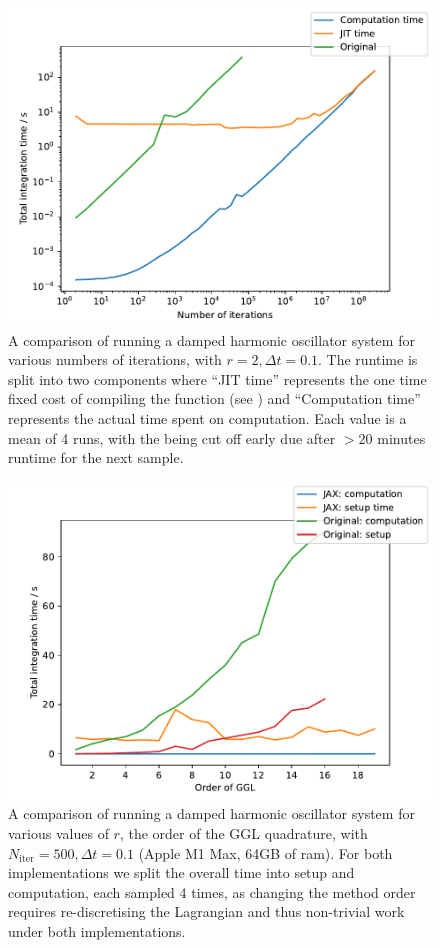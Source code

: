 \begin{figure}[t]
  \label{fig:dho-n-runtime}
  \includegraphics[width=\columnwidth]{figures/dho_n_runtime.pdf}
  \caption{A comparison of running a damped harmonic oscillator system for various numbers of iterations, with $r = 2, \Delta t = 0.1$. The \updimpl{} runtime is split into two components where \enquote{JIT time} represents the one time fixed cost of compiling the function (see ) and \enquote{Computation time} represents the actual time spent on computation.
  Each value is a mean of 4 runs, with the \orgimpl{} being cut off early due after $> 20$ minutes runtime for the next sample.}
\end{figure}

\begin{figure}[t]
  \label{fig:dho-r-runtime}
  \includegraphics[width=\columnwidth]{figures/dho_r_runtime_linear.pdf}
  \caption{A comparison of running a damped harmonic oscillator system for various values of $r$, the order of the GGL quadrature, with $N_{\mathrm{iter}} = 500, \Delta t = 0.1$ (Apple M1 Max, 64GB of ram).
	For both implementations we split the overall time into setup and computation, each sampled 4 times, as changing the method order requires re-discretising the Lagrangian and thus non-trivial work under both implementations.}
\end{figure}

